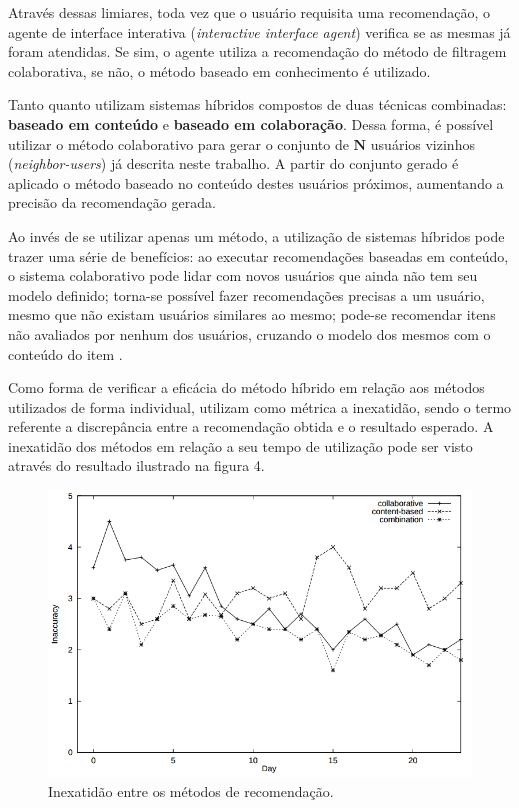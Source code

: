 \documentclass[12pt, openright, oneside, a4paper, brazil]{abntex2}
\begin{document}
Através dessas limiares, toda vez que o usuário requisita uma recomendação, o agente de interface interativa (\textit{interactive interface agent}) verifica se as mesmas já foram atendidas. Se sim, o agente utiliza a recomendação do método de filtragem colaborativa, se não, o método baseado em conhecimento é utilizado.

Tanto  quanto  utilizam sistemas híbridos compostos de duas técnicas combinadas: \textbf{baseado em conteúdo} e \textbf{baseado em colaboração}. Dessa forma, é possível utilizar o método colaborativo para gerar o conjunto de $\textbf{N}$ usuários vizinhos (\textit{neighbor-users}) já descrita neste trabalho. A partir do conjunto gerado é aplicado o método baseado no conteúdo destes usuários próximos, aumentando a precisão da recomendação gerada.

Ao invés de se utilizar apenas um método, a utilização de sistemas híbridos pode trazer uma série de benefícios: ao executar recomendações baseadas em conteúdo, o sistema colaborativo pode lidar com novos usuários que ainda não tem seu modelo definido; torna-se possível fazer recomendações precisas a um usuário, mesmo que não existam usuários similares ao mesmo; pode-se recomendar itens não avaliados por nenhum dos usuários, cruzando o modelo dos mesmos com o conteúdo do item \cite{balabanovic1997fab}.

Como forma de verificar a eficácia do método híbrido em relação aos métodos utilizados de forma individual,  utilizam como métrica a inexatidão, sendo o termo referente a discrepância entre a recomendação obtida e o resultado esperado. A inexatidão dos métodos em relação a seu tempo de utilização pode ser visto através do resultado ilustrado na figura 4.

\begin{figure}[h!tp]
	\caption{\label{innacurace}Inexatidão entre os métodos de recomendação.}
	\begin{center}
		\includegraphics[scale=0.8]{images/innacurace.png}
	\end{center}
\end{figure}
\end{document}
